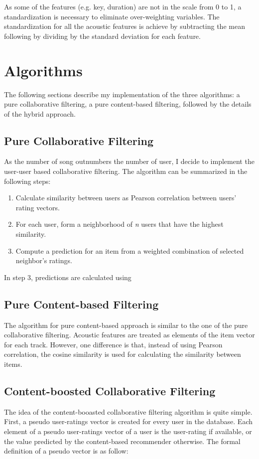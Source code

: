 As some of the features (e.g. key, duration) are not in the scale from 0 to 1, a standardization is necessary to eliminate over-weighting variables. The standardization for all the acoustic features is achieve by subtracting the mean following by dividing by the standard deviation for each feature. 


\section{Algorithms}

The following sections describe my implementation of the three algorithms: a pure collaborative filtering, a pure content-based filtering, followed by the details of the hybrid approach.

\subsection{Pure Collaborative Filtering}
As the number of song outnumbers the number of user, I decide to implement the user-user based collaborative filtering. The algorithm can be summarized in the following steps:

\begin{enumerate}
	\item Calculate similarity between users as Pearson correlation between users' rating vectors. 
	\item For each user, form a neighborhood of \textit{n} users that have the highest similarity.
	\item Compute a prediction for an item from a weighted combination of selected neighbor's ratings. 
\end{enumerate}

In step 3, predictions are calculated using 

\subsection{Pure Content-based Filtering}
The algorithm for pure content-based approach is similar to the one of the pure collaborative filtering. Acoustic features are treated as elements of the item vector for each track. However, one difference is that, instead of using Pearson correlation, the cosine similarity is used for calculating the similarity between items.

\subsection{Content-boosted Collaborative Filtering}
The idea of the content-booasted collaborative filtering algorithm is quite simple. First, a pseudo user-ratings vector is created for every user in the database. Each element of a pseudo user-ratings vector of a user is the user-rating if available, or the value predicted by the content-based recommender otherwise. The formal definition of a pseudo vector is as follow:

